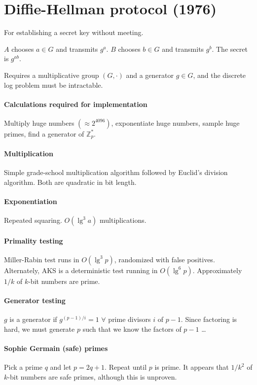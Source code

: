 \documentclass[11pt]{article}
\newcommand{\ZZ}{\ensuremath{\mathds{Z}}}
\theoremstyle{remark}
\begin{document}
\section{Diffie-Hellman protocol (1976)}

For establishing a secret key without meeting.

$A$ chooses $a \in G$ and transmits $g^a$.
$B$ chooses $b \in G$ and transmits $g^b$.
The secret is $g^{ab}$.

Requires a multiplicative group $(G,\cdot)$
and a generator $g\in G$,
and the discrete log problem must be intractable.

\paragraph{Calculations required for implementation}
Multiply huge numbers $(\approx 2^{4096})$,
exponentiate huge numbers,
sample huge primes, find a generator of $\ZZ_p^*$.

\paragraph{Multiplication}
Simple grade-school multiplication algorithm
followed by Euclid's division algorithm.
Both are quadratic in bit length.

\paragraph{Exponentiation}
Repeated squaring. $O(\lg^3 a)$ multiplications.

\paragraph{Primality testing}
Miller-Rabin test runs in $O(\lg^3p)$, randomized with false positives.
Alternately, AKS is a deterministic test running in $O(\lg^6p)$.
Approximately $1/k$ of $k$-bit numbers are prime.

\paragraph{Generator testing}
$g$ is a generator if $g^{(p-1)/i}=1$ $\forall$
prime divisors $i$ of $p-1$.
Since factoring is hard, we must generate $p$ such that we know
the factors of $p-1$ \ldots

\paragraph{Sophie Germain (safe) primes}
Pick a prime $q$ and let $p=2q+1$. Repeat until $p$ is prime.
It appears that $1/k^2$ of $k$-bit numbers are safe primes,
although this is unproven.
\end{document}
